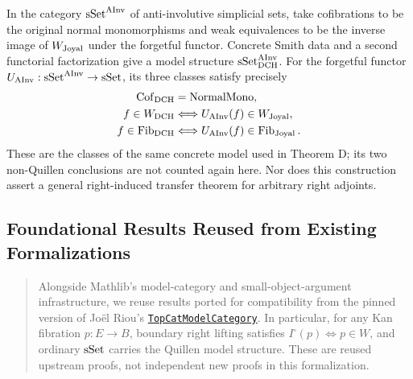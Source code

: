 \begin{resultblock}
\begin{theorem}
In the category $\mathrm{sSet}^{\mathrm{AInv}}$ of anti-involutive simplicial sets, take cofibrations to be the original normal monomorphisms and weak equivalences to be the inverse image of $W_{\mathrm{Joyal}}$ under the forgetful functor.
Concrete Smith data and a second functorial factorization give a model structure $\mathrm{sSet}^{\mathrm{AInv}}_{\mathrm{DCH}}$.
For the forgetful functor $U_{\mathrm{AInv}}:\mathrm{sSet}^{\mathrm{AInv}}\to\mathrm{sSet}$, its three classes satisfy precisely
\begin{align}
\operatorname{Cof}_{\mathrm{DCH}} &= \operatorname{NormalMono}, \\
f\in W_{\mathrm{DCH}}
  &\Longleftrightarrow U_{\mathrm{AInv}}(f)\in W_{\mathrm{Joyal}}, \\
f\in\operatorname{Fib}_{\mathrm{DCH}}
  &\Longleftrightarrow U_{\mathrm{AInv}}(f)\in\operatorname{Fib}_{\mathrm{Joyal}}.
\end{align}
These are the classes of the same concrete model used in Theorem D; its two non-Quillen conclusions are not counted again here.
Nor does this construction assert a general right-induced transfer theorem for arbitrary right adjoints.
\end{theorem}
\end{resultblock}

\subsection{Foundational Results Reused from Existing Formalizations}

\begin{quote}
\raggedright
Alongside Mathlib's model-category and small-object-argument infrastructure, we reuse results ported for compatibility from the pinned version of Jo\"el Riou's
\href{https://github.com/joelriou/topcat-model-category/tree/6c0c356fea469689fe76baeb47ba773460dfacee}{\texttt{TopCatModelCategory}}.
In particular, for any Kan fibration $p:E\to B$, boundary right lifting satisfies $I^{\square}(p)\Leftrightarrow p\in W$, and ordinary $\mathrm{sSet}$ carries the Quillen model structure.
These are reused upstream proofs, not independent new proofs in this formalization.
\end{quote}
